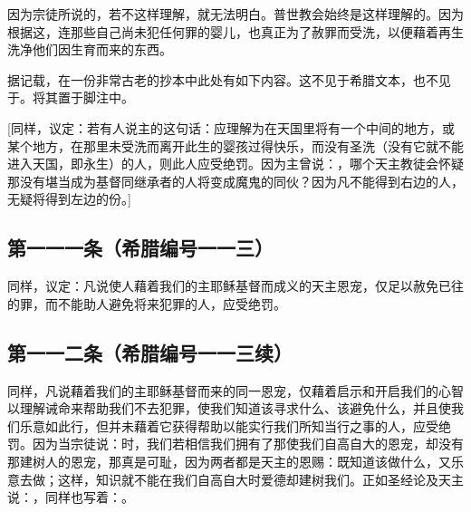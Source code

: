 因为宗徒所说的，若不这样理解，就无法明白。普世教会始终是这样理解的。因为根据这，连那些自己尚未犯任何罪的婴儿，也真正为了赦罪而受洗，以便藉着再生洗净他们因生育而来的东西。\par

据记载，在一份非常古老的抄本中此处有如下内容。这不见于希腊文本，也不见于。将其置于脚注中。\par

[同样，议定：若有人说主的这句话：应理解为在天国里将有一个中间的地方，或某个地方，在那里未受洗而离开此生的婴孩过得快乐，而没有圣洗（没有它就不能进入天国，即永生）的人，则此人应受绝罚。因为主曾说：，哪个天主教徒会怀疑那没有堪当成为基督同继承者的人将变成魔鬼的同伙？因为凡不能得到右边的人，无疑将得到左边的份。]\par


\subsection{第一一一条（希腊编号一一三）}

\par

同样，议定：凡说使人藉着我们的主耶稣基督而成义的天主恩宠，仅足以赦免已往的罪，而不能助人避免将来犯罪的人，应受绝罚。\par


\subsection{第一一二条（希腊编号一一三续）}

\par

同样，凡说藉着我们的主耶稣基督而来的同一恩宠，仅藉着启示和开启我们的心智以理解诫命来帮助我们不去犯罪，使我们知道该寻求什么、该避免什么，并且使我们乐意如此行，但并未藉着它获得帮助以能实行我们所知当行之事的人，应受绝罚。因为当宗徒说：时，我们若相信我们拥有了那使我们自高自大的恩宠，却没有那建树人的恩宠，那真是可耻，因为两者都是天主的恩赐：既知道该做什么，又乐意去做；这样，知识就不能在我们自高自大时爱德却建树我们。正如圣经论及天主说：，同样也写着：。\par

